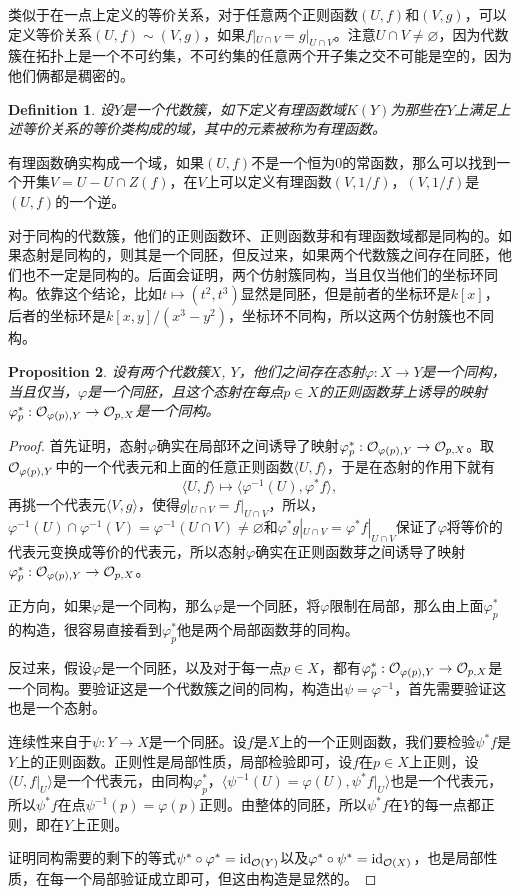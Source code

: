 \documentclass[9pt]{extarticle}
\theoremstyle{plain}%
\newtheorem{defi}{Definition}[section]%
\newtheorem{pro}[defi]{Proposition}%
\begin{document}
类似于在一点上定义的等价关系，对于任意两个正则函数$(U,f)$和$(V,g)$，可以定义等价关系$(U,f)\sim(V,g)$，如果$f|_{U\cap V}=g|_{U\cap V}$。注意$U\cap V\neq \varnothing$，因为代数簇在拓扑上是一个不可约集，不可约集的任意两个开子集之交不可能是空的，因为他们俩都是稠密的。
\begin{defi}
	设$Y$是一个代数簇，如下定义有理函数域$K(Y)$为那些在$Y$上满足上述等价关系的等价类构成的域，其中的元素被称为有理函数。
\end{defi}
有理函数确实构成一个域，如果$(U,f)$不是一个恒为0的常函数，那么可以找到一个开集$V=U-U\cap Z(f)$，在$V$上可以定义有理函数$(V,1/f)$，$(V,1/f)$是$(U,f)$的一个逆。

对于同构的代数簇，他们的正则函数环、正则函数芽和有理函数域都是同构的。如果态射是同构的，则其是一个同胚，但反过来，如果两个代数簇之间存在同胚，他们也不一定是同构的。后面会证明，两个仿射簇同构，当且仅当他们的坐标环同构。依靠这个结论，比如$t\mapsto (t^2,t^3)$显然是同胚，但是前者的坐标环是$k[x]$，后者的坐标环是$k[x,y]/(x^3-y^2)$，坐标环不同构，所以这两个仿射簇也不同构。

\begin{pro}
	设有两个代数簇$X$, $Y$，他们之间存在态射$\varphi:X\to Y$是一个同构，当且仅当，$\varphi$是一个同胚，且这个态射在每点$p\in X$的正则函数芽上诱导的映射$\varphi^*_p:\mathcal{O}_{\varphi(p),Y}\to \mathcal{O}_{p,X}$是一个同构。
	\label{c3:p3}
\end{pro}
\begin{proof}
	首先证明，态射$\varphi$确实在局部环之间诱导了映射$\varphi^*_p:\mathcal{O}_{\varphi(p),Y}\to \mathcal{O}_{p,X}$。取$\mathcal{O}_{\varphi(p),Y}$中的一个代表元和上面的任意正则函数$\langle U,f\rangle$，于是在态射的作用下就有
	\[
		\langle U,f\rangle\mapsto \langle \varphi^{-1}(U),\varphi^*f\rangle,
	\]
	再挑一个代表元$\langle V,g\rangle$，使得$g|_{U\cap V}=f|_{U\cap V}$，所以，$\varphi^{-1}(U)\cap \varphi^{-1}(V)=\varphi^{-1}(U\cap  V)\neq \varnothing$和$\varphi^*g|_{U\cap V}=\varphi^*f|_{U\cap V}$保证了$\varphi$将等价的代表元变换成等价的代表元，所以态射$\varphi$确实在正则函数芽之间诱导了映射$\varphi^*_p:\mathcal{O}_{\varphi(p),Y}\to \mathcal{O}_{p,X}$。

	正方向，如果$\varphi$是一个同构，那么$\varphi$是一个同胚，将$\varphi$限制在局部，那么由上面$\varphi^*_p$的构造，很容易直接看到$\varphi^*_p$他是两个局部函数芽的同构。

	反过来，假设$\varphi$是一个同胚，以及对于每一点$p\in X$，都有$\varphi^*_p:\mathcal{O}_{\varphi(p),Y}\to \mathcal{O}_{p,X}$是一个同构。要验证这是一个代数簇之间的同构，构造出$\psi=\varphi^{-1}$，首先需要验证这也是一个态射。

	连续性来自于$\psi:Y\to X$是一个同胚。设$f$是$X$上的一个正则函数，我们要检验$\psi^* f$是$Y$上的正则函数。正则性是局部性质，局部检验即可，设$f$在$p\in X$上正则，设$\langle U,f|_U\rangle$是一个代表元，由同构$\varphi^*_p$，$\langle \psi^{-1}(U)=\varphi(U),\psi^* f|_U\rangle$也是一个代表元，所以$\psi^* f$在点$\psi^{-1}(p)=\varphi(p)$正则。由整体的同胚，所以$\psi^* f$在$Y$的每一点都正则，即在$Y$上正则。

	证明同构需要的剩下的等式$\psi^*\circ \varphi^*=\operatorname{id}_{\mathcal{O}(Y)}$以及$\varphi^*\circ\psi^* =\operatorname{id}_{\mathcal{O}(X)}$，也是局部性质，在每一个局部验证成立即可，但这由构造是显然的。
\end{proof}
\end{document}
